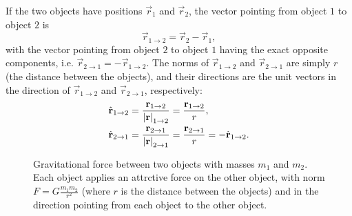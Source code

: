 If the two objects have positions $\vec{r}_{1}$ and $\vec{r}_{2}$, the vector pointing from object $1$ to object $2$ is
\begin{equation}
	\vec{r}_{1\to2} = \vec{r}_{2} - \vec{r}_{1},
	\label{eq:position_vector}
\end{equation}
with the vector pointing from object $2$ to object $1$ having the exact opposite components, i.e. $\vec{r}_{2\to1}=-\vec{r}_{1\to2}$. The norms of $\vec{r}_{1\to2}$ and $\vec{r}_{2\to1}$ are simply $r$ (the distance between the objects), and their directions are the unit vectors in the direction of $\vec{r}_{1\to2}$ and $\vec{r}_{2\to1}$, respectively:
\begin{align}
	\hat{\mathbf{r}}_{1\to2} & = \frac{\mathbf{r}_{1\to2}}{\left| \mathbf{r} \right|_{1\to2}} = \frac{\mathbf{r}_{1\to2}}{r}\nonumber,            \\
	\hat{\mathbf{r}}_{2\to1} & = \frac{\mathbf{r}_{2\to1}}{\left| \mathbf{r} \right|_{2\to1}} = \frac{\mathbf{r}_{2\to1}}{r} = -\hat{\mathbf{r}}_{1\to2}.
	\label{eq:normed_position_vector}
\end{align}

\begin{figure}
	\begin{center}
	\end{center}
	\caption{Gravitational force between two objects with masses $m_{1}$ and $m_{2}$. Each object applies an attrctive force on the other object, with norm $F=G\frac{m_{1}m_{2}}{r^{2}}$ (where $r$ is the distance between the objects) and in the direction pointing from each object to the other object.}
	\label{fig:gravity_basics}
\end{figure}

